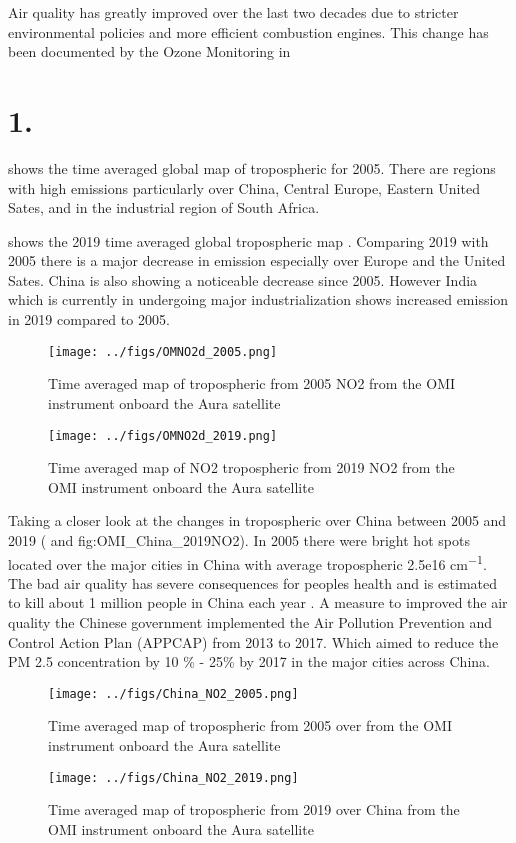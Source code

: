 Air quality has greatly improved over the last two decades due to stricter environmental
policies and more efficient combustion engines. This change has been documented by the 
Ozone Monitoring in  
\section*{1.} 
 shows the time averaged global map of tropospheric 
 for 2005. There are regions with high emissions particularly over 
China, Central Europe, Eastern United Sates, and in the industrial region of South Africa. 

 shows the 2019 time averaged global tropospheric
map  . Comparing 2019 with 2005 there is a major 
decrease in  emission especially over Europe and the United Sates. China is also 
showing a noticeable decrease since 2005. However India which is currently in undergoing 
major industrialization shows increased  emission in 2019 compared to 2005. 

\begin{figure}[htbp]
    \centering
        \texttt{[image: ../figs/OMNO2d\_2005.png]}
    \caption{Time averaged map of  tropospheric from 2005 NO2 from the OMI instrument
    onboard the Aura satellite   }
    \label{fig:OMI_global_2005NO2}
\end{figure}

\begin{figure}[htpb]
    \centering
        \texttt{[image: ../figs/OMNO2d\_2019.png]}
    \caption{Time averaged map of NO2 tropospheric from 2019 NO2 from the OMI instrument  
    onboard the Aura satellite}
    \label{fig:OMI_global_2019NO2}
\end{figure}
Taking a closer look at the changes in tropospheric  over China
between 2005 and 2019 ( and \Cref
{fig:OMI_China_2019NO2}). In 2005 there were bright hot spots located
over the major cities in China with average tropospheric
 2.5e16 \si{cm^{-1}}. The bad air quality has severe consequences 
for peoples health and is estimated to kill about 1 million people in 
China each year \parencite{yue2020stronger}. A measure to improved the 
air quality the Chinese government implemented the Air Pollution 
Prevention and Control Action Plan (APPCAP) from 2013 to 2017. Which 
aimed to reduce the PM 2.5 concentration by 10 \% - 25\% by 2017 in the major cities across China.      
\begin{figure}[htpb]
    \centering
    \texttt{[image: ../figs/China\_NO2\_2005.png]}
    \caption{Time averaged map of tropospheric  from 2005 over 
    from the OMI instrument onboard the Aura satellite}
    \label{fig:OMI_ChinaNO2}
\end{figure}

\begin{figure}[htpb]
    \centering
        \texttt{[image: ../figs/China\_NO2\_2019.png]}
    \caption{Time averaged map of tropospheric  from 2019 
    over China from the OMI instrument  
    onboard the Aura satellite}
    \label{fig:OMI_China_2019NO2}
\end{figure}

